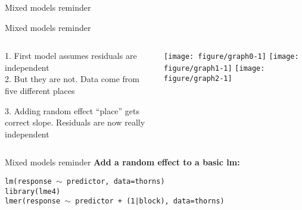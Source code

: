 \documentclass{beamer}
\begin{document}
\begin{frame}{Mixed models reminder}
\centering
\end{frame}
\begin{frame}{Mixed models reminder}
\vspace{-1cm}
\begin{columns}
    \begin{column}{0.5\textwidth}
     1. First model assumes residuals are independent\\
     \vspace{1cm}
     2. But they are not. Data come from five different places\\
     \vspace{1cm}
     
     3. Adding random effect ``place'' gets correct slope. Residuals are now really independent
    \end{column}

    \begin{column}{0.5\textwidth}
     \texttt{[image: figure/graph0-1]}\vspace{-1cm}
     \texttt{[image: figure/graph1-1]}\vspace{-1cm}
     \texttt{[image: figure/graph2-1]}
    \end{column}
\end{columns}

\end{frame}

\begin{frame}{Mixed models reminder}
\textbf{Add a random effect to a basic lm:\\}

\texttt{lm(response $\sim$ predictor, data=thorns)}\\

\texttt{library(lme4)}\\
\texttt{lmer(response $\sim$ predictor + (1|block), data=thorns)}\\


\vfill
{}


\end{frame}
\end{document}
